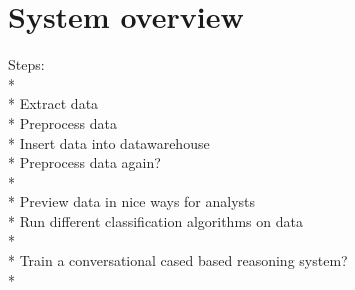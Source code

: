 \chapter{System overview}

Steps:\\*
\\*
Extract data\\*
Preprocess data\\*
Insert data into datawarehouse\\*
Preprocess data again?\\*
\\*
Preview data in nice ways for analysts\\*
Run different classification algorithms on data\\*
\\*
Train a conversational cased based reasoning system?\\*





